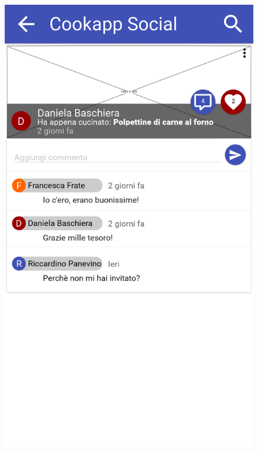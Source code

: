 \begin{figure}[H]
\begin{minipage}{.49\textwidth}
		\includegraphics[width=\textwidth]{img/wireframe/commenti.png}
	\end{minipage}
\end{figure}
